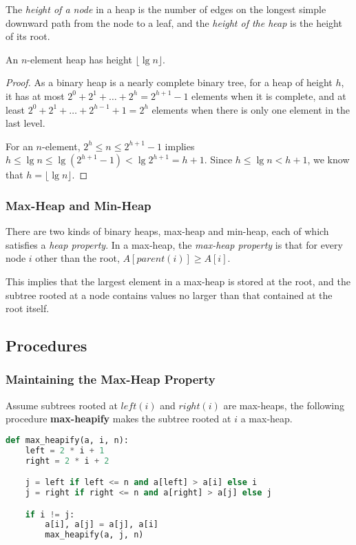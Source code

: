 \documentclass[11pt]{article}
\begin{document}
The \emph{height of a node} in a heap is the number of edges on the longest simple
downward path from the node to a leaf, and the \emph{height of the heap} is the
height of its root.

An $n$-element heap has height $\lfloor \lg n \rfloor$.

\begin{proof}
As a binary heap is a nearly complete binary tree, for a heap of height $h$, it has
at most $2^0+2^1+\dots+2^h=2^{h+1}-1$ elements when it is complete, and at least
$2^0+2^1+\dots+2^{h-1}+1=2^h$ elements when there is only one element in the last
level.

For an $n$-element, $2^h \leq n \leq 2^{h+1}-1$ implies
$h \leq \lg n \leq \lg(2^{h+1}-1) < \lg 2^{h+1} = h+1$. Since $h \leq \lg n < h+1$,
we know that $h=\lfloor \lg n \rfloor$.
\end{proof}

\subsubsection{Max-Heap and Min-Heap}

There are two kinds of binary heaps, max-heap and min-heap, each of which satisfies
a \emph{heap property}. In a max-heap, the \emph{max-heap property} is that for
every node $i$ other than the root, $A[parent(i)] \geq A[i]$.

This implies that the largest element in a max-heap is stored at the root, and the
subtree rooted at a node contains values no larger than that contained at the root
itself.

\subsection{Procedures}

\subsubsection{Maintaining the Max-Heap Property}

Assume subtrees rooted at $left(i)$ and $right(i)$ are max-heaps, the following
procedure \textbf{max-heapify} makes the subtree rooted at $i$ a max-heap.

\begin{lstlisting}[language=Python]
def max_heapify(a, i, n):
    left = 2 * i + 1
    right = 2 * i + 2

    j = left if left <= n and a[left] > a[i] else i
    j = right if right <= n and a[right] > a[j] else j

    if i != j:
        a[i], a[j] = a[j], a[i]
        max_heapify(a, j, n)
\end{lstlisting}
\end{document}
